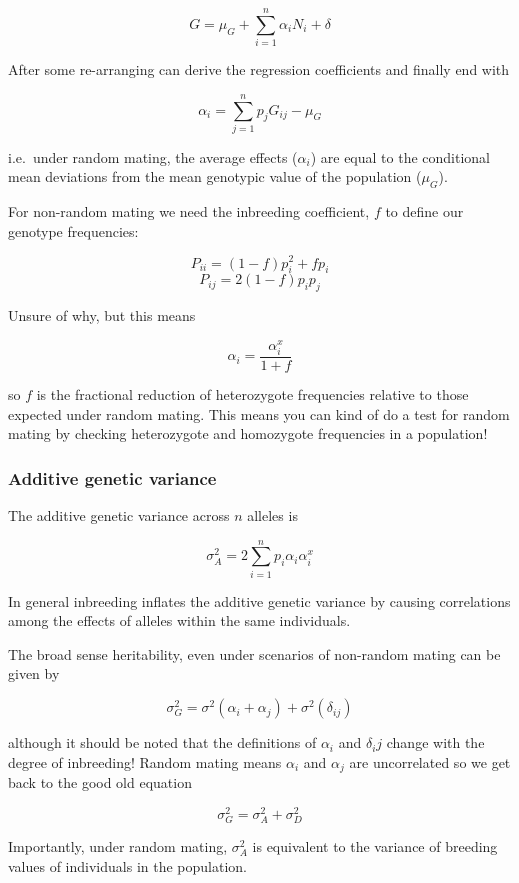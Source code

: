 \documentclass[
]{article}
\begin{document}
\[ G = \mu_G + \sum_{i=1}^{n} \alpha_{i}N_{i} + \delta \]

After some re-arranging can derive the regression coefficients and
finally end with

\[ \alpha_i = \sum_{j=1}^{n} p_jG_{ij} - \mu_G \]

i.e.~under random mating, the average effects (\(\alpha_i\)) are equal
to the conditional mean deviations from the mean genotypic value of the
population (\(\mu_G\)).

For non-random mating we need the inbreeding coefficient, \(f\) to
define our genotype frequencies:

\[ P_{ii} = (1 - f)p^2_i + fp_i \] \[ P_{ij} = 2(1 -f)p_ip_j \]

Unsure of why, but this means

\[ \alpha_i = \frac{\alpha^x_i} {1 + f} \]

so \(f\) is the fractional reduction of heterozygote frequencies
relative to those expected under random mating. This means you can kind
of do a test for random mating by checking heterozygote and homozygote
frequencies in a population!

\hypertarget{additive-genetic-variance}{%
\subsubsection{Additive genetic
variance}\label{additive-genetic-variance}}

The additive genetic variance across \(n\) alleles is

\[ \sigma^2_A = 2 \sum_{i=1}^{n} p_i\alpha_i\alpha^x_i \]

In general inbreeding inflates the additive genetic variance by causing
correlations among the effects of alleles within the same individuals.

The broad sense heritability, even under scenarios of non-random mating
can be given by

\[ \sigma^2_G = \sigma^{2}(\alpha_i + \alpha_j) + \sigma^{2}(\delta_{ij}) \]

although it should be noted that the definitions of \(\alpha_i\) and
\(\delta_ij\) change with the degree of inbreeding! Random mating means
\(\alpha_i\) and \(\alpha_j\) are uncorrelated so we get back to the
good old equation

\[ \sigma^2_G = \sigma^2_A + \sigma^2_D \]

Importantly, under random mating, \(\sigma^2_A\) is equivalent to the
variance of breeding values of individuals in the population.
\end{document}

